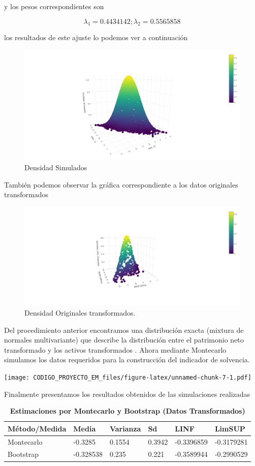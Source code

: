 \documentclass[
]{article}
\begin{document}
y los pesos correspondientes son

\[\lambda_1=0.4434142 ; \lambda_2= 0.5565858\]

los resultados de este ajuste lo podemos ver a continuación

\begin{figure}[h]
  \centering
  \includegraphics[width=0.8\linewidth]{simulados.png}
  \caption{Densidad Simulados}
  \label{fig:etiqueta}
\end{figure}

También podemos observar la gráfica correspondiente a los datos
originales transformados

\begin{figure}[h]
  \centering
  \includegraphics[width=0.8\linewidth]{originales.jpg}
  \caption{Densidad Originales transformados.}
  \label{fig:etiqueta}
\end{figure}

Del procedimiento anterior encontramos una distribución exacta (mixtura
de normales multivariante) que describe la distribución entre el
patrimonio neto transformado y los activos transformados . Ahora
mediante Montecarlo simulamos los datos requeridos para la construcción
del indicador de solvencia.

\texttt{[image: CODIGO\_PROYECTO\_EM\_files/figure-latex/unnamed-chunk-7-1.pdf]}

Finalmente presentamos los resultados obtenidos de las simulaciones
realizadas

\begin{table}[!h]
    \centering
    \caption{\textbf{Estimaciones por Montecarlo y Bootstrap (Datos Transformados)}}
    \begin{tabular}{|l|l|l|l|l|l|}
    \hline
        Método/Medida & Media & Varianza & Sd & LINF & LimSUP \\ \hline
        Montecarlo & -0.3285 & 0.1554 & 0.3942 & -0.3396859 & -0.3179281 \\ \hline
        Bootstrap & -0.328538 & 0.235 & 0.221 & -0.3589944  & -0.2990529  \\ \hline
    \end{tabular}
\end{table}
\end{document}
